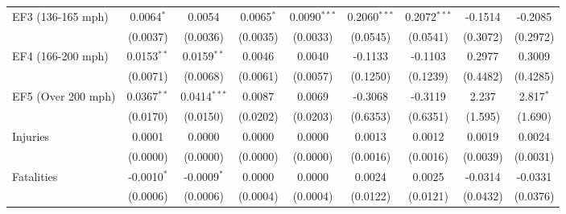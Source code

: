 \documentclass[letterpaper]{article}
\begin{document}
\begin{table}[H]
\begin{tabular}{lcccccccc}
   EF3 (136-165 mph) & 0.0064$^{*}$             & 0.0054                        & 0.0065$^{*}$                  & 0.0090$^{***}$                  & 0.2060$^{***}$               & 0.2072$^{***}$                 & -0.1514                       & -0.2085\\   
                   & (0.0037)                 & (0.0036)                      & (0.0035)                      & (0.0033)                        & (0.0545)                     & (0.0541)                       & (0.3072)                      & (0.2972)\\   
   EF4 (166-200 mph) & 0.0153$^{**}$            & 0.0159$^{**}$                 & 0.0046                        & 0.0040                          & -0.1133                      & -0.1103                        & 0.2977                        & 0.3009\\   
                   & (0.0071)                 & (0.0068)                      & (0.0061)                      & (0.0057)                        & (0.1250)                     & (0.1239)                       & (0.4482)                      & (0.4285)\\   
   EF5 (Over 200 mph) & 0.0367$^{**}$            & 0.0414$^{***}$                & 0.0087                        & 0.0069                          & -0.3068                      & -0.3119                        & 2.237                         & 2.817$^{*}$\\   
                   & (0.0170)                 & (0.0150)                      & (0.0202)                      & (0.0203)                        & (0.6353)                     & (0.6351)                       & (1.595)                       & (1.690)\\   
   Injuries             & 0.0001                   & 0.0000          & 0.0000          & 0.0000            & 0.0013                       & 0.0012                         & 0.0019                        & 0.0024\\   
                   & (0.0000)    & (0.0000)        & (0.0000)        & (0.0000)          & (0.0016)                     & (0.0016)                       & (0.0039)                      & (0.0031)\\   
   Fatalities             & -0.0010$^{*}$            & -0.0009$^{*}$                 & 0.0000        & 0.0000            & 0.0024                       & 0.0025                         & -0.0314                       & -0.0331\\   
                   & (0.0006)                 & (0.0006)                      & (0.0004)                      & (0.0004)                        & (0.0122)                     & (0.0121)                       & (0.0432)                      & (0.0376)\\   

\end{tabular}
\end{table}
\end{document}
